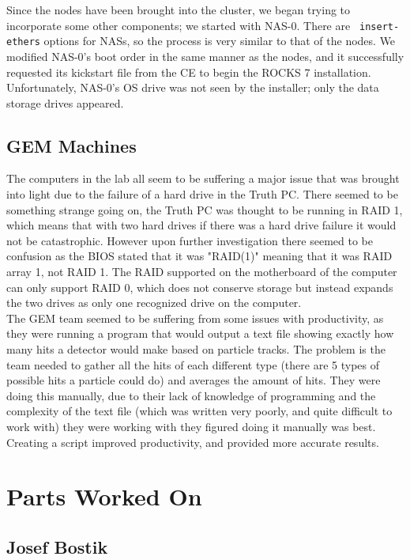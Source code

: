 \documentclass[12pt]{article}
\newcommand\tab[1][1cm]{\hspace*{#1}}
\begin{document}
\tab Since the nodes have been brought into the cluster, we began trying to
incorporate some other components; we started with NAS-0. There are {\tt
  insert-ethers} options for NASs, so the process is very similar to that of the
nodes. We modified NAS-0's boot order in the same manner as the nodes, and it
successfully requested its kickstart file from the CE to begin the ROCKS 7
installation. Unfortunately, NAS-0's OS drive was not seen by the installer;
only the data storage drives appeared. 

\subsection{GEM Machines}

\tab The computers in the lab all seem to be suffering a major issue that was
brought into light due to the failure of a hard drive in the Truth PC. There
seemed to be something strange going on, the Truth PC was thought to be running
in RAID 1, which means that with two hard drives if there was a hard drive failure it would not be catastrophic. However upon further investigation there
seemed to be confusion as the BIOS stated that it was "RAID(1)" meaning that it 
was RAID array 1, not RAID 1. The RAID supported on the motherboard of the 
computer can only support RAID 0, which does not conserve storage but instead
expands the two drives as only one recognized drive on the computer. \\

\tab The GEM team seemed to be suffering from some issues with productivity, as
they were running a program that would output a text file showing exactly how
many hits a detector would make based on particle tracks. The problem is the
team needed to gather all the hits of each different type (there are 5 types of
possible hits a particle could do) and averages the amount of hits. They were
doing this manually, due to their lack of knowledge of programming and the
complexity of the text file (which was written very poorly, and quite difficult
to work with) they were working with they figured doing it manually was best. 
Creating a script improved productivity, and provided more accurate results. 

\section{Parts Worked On}

\subsection{Josef Bostik}
\end{document}
